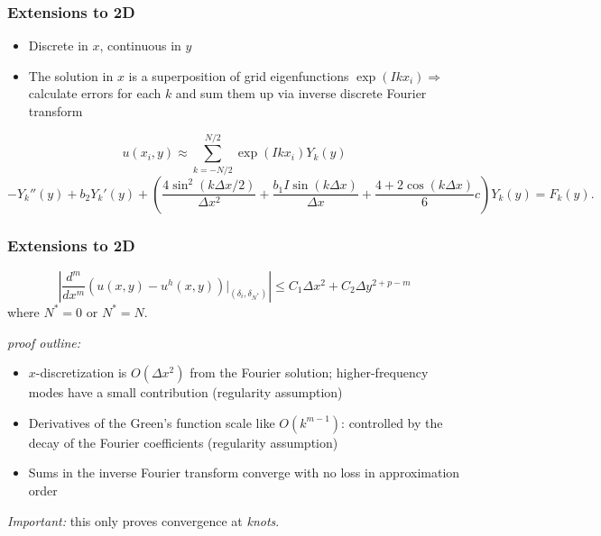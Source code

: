 \documentclass[8pt]{beamer}
\newcommand{\I}{I}
\begin{document}
\begin{frame}
    \frametitle{Extensions to 2D}
    \begin{itemize}
        \item Discrete in \(x\), continuous in \(y\)
        \item The solution in \(x\) is a superposition of grid eigenfunctions
              \(\exp(I k x_i) \Rightarrow\) calculate errors for each \(k\) and
              sum them up via inverse discrete Fourier transform
    \end{itemize}
    \pause
    \vspace{0.25in}
    \begin{equation*}
        u(x_i, y) \approx \sum_{k = -N/2}^{N/2} \exp(I k x_i) Y_k(y)
    \end{equation*}
    \pause
    \begin{equation*}
        -Y_k''(y)
        + b_2 Y_k'(y)
        +
        \left(
        \dfrac{4 \sin^2(k \Delta x/2)}{\Delta x^2}
        + \dfrac{b_1 \I \sin(k \Delta x)}{\Delta x}
        + \dfrac{4 + 2 \cos(k \Delta x)}{6} c
        \right) Y_k(y)
        = F_k(y).
    \end{equation*}
\end{frame}

\begin{frame}
    \frametitle{Extensions to 2D}
    \begin{equation*}
        \left|
        \dfrac{d^m}{dx^m}
        \left(u(x, y) - u^h(x, y) \right)
        \bigg|_{(\delta_i, \delta_{N^*})}
        \right|
        \leq
        C_1 \Delta x^{2}
        +
        C_2 \Delta y^{2 + p - m}
    \end{equation*}
    where \(N^* = 0\) or \(N^* = N\).

    \emph{proof outline:}
    \begin{itemize}
        \item \(x\)-discretization is \(O(\Delta x^2)\) from the Fourier
              solution; higher-frequency modes have a small contribution
              (regularity assumption)
        \item Derivatives of the Green's function scale like \(O(k^{m - 1})\):
              controlled by the decay of the Fourier coefficients (regularity
              assumption)
        \item Sums in the inverse Fourier transform converge with no loss in
              approximation order
    \end{itemize}

    \emph{Important:} this only proves convergence at \emph{knots}.
\end{frame}
\end{document}
